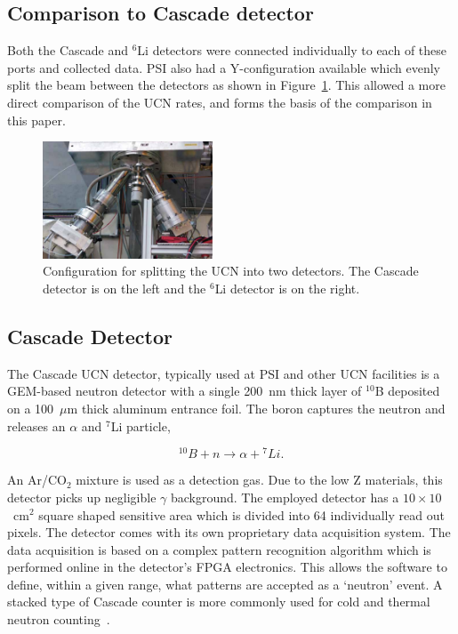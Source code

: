 \documentclass[twocolumn]{bmcart}
\begin{document}
\subsection{ Comparison to Cascade detector }

Both the Cascade and $^6$Li detectors were connected individually to
each of these ports and collected data.  PSI also had a
Y-configuration available which evenly split the beam between the
detectors as shown in Figure~\ref{fig:yConfig}.  This allowed a more
direct comparison of the UCN rates, and forms the basis of the
comparison in this paper.

\begin{figure}[!htpb] 
\centering \includegraphics[width=0.45\textwidth]{figures/yConfig.pdf}
\caption{Configuration for splitting the UCN into two detectors.  The
  Cascade detector is on the left and the $^6$Li detector is on the
  right.}
\label{fig:yConfig}
\end{figure}


\subsection{Cascade Detector}

The Cascade UCN detector, typically used at PSI and other UCN
facilities is a GEM-based neutron detector with a single 200~nm thick
layer of $^{10}$B deposited on a 100~$\mu$m thick aluminum entrance
foil. The boron captures the neutron and releases an $\alpha$ and
$^7$Li particle,

\begin{equation}
^{10}B + n \rightarrow \alpha + {^7}Li.
\end{equation}

An Ar/CO$_2$ mixture is used as a detection gas.  Due to the low Z
materials, this detector picks up negligible $\gamma$ background. The
employed detector has a $10 \times 10$~cm$^2$ square shaped sensitive
area which is divided into 64 individually read out pixels.  The
detector comes with its own proprietary data acquisition system.  The
data acquisition is based on a complex pattern recognition algorithm
which is performed online in the detector's FPGA electronics.  This
allows the software to define, within a given range, what patterns are
accepted as a `neutron' event.  A stacked type of Cascade counter is
more commonly used for cold and thermal neutron
counting~\cite{cascade}.
\end{document}
